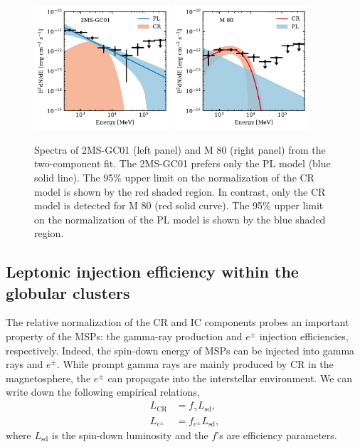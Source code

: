 \documentclass[doublespace,nopageskip]{VTthesis} %
\begin{document}
\begin{figure}[htb]
    \centering
    \includegraphics[width=0.45\textwidth]{Figures/Globular/spectra/2comp_0.pdf}
    \includegraphics[width=0.45\textwidth]{Figures/Globular/spectra/2comp_8.pdf}
    \caption{Spectra of 2MS-GC01 (left panel) and M 80 (right panel) from the two-component fit. The 2MS-GC01 prefers only the {PL} model (blue solid line). The 95\% upper limit on the normalization of the CR model is shown by the red shaded region. In contrast, only the CR model is detected for M 80 (red solid curve). The 95\% upper limit on the normalization of the {PL} model is shown by the blue shaded region.}
    \label{fig:global_spectra_ul}
\end{figure}

\subsection{Leptonic injection efficiency within the globular clusters}\label{spectra_fe}

The relative normalization of the CR and IC components probes an important property of the MSPs: the gamma-ray production and $e^\pm$ injection efficiencies, respectively. Indeed, the spin-down energy of MSPs can be injected into gamma rays and $e^\pm$. While prompt gamma rays are mainly produced by CR in the magnetosphere, the $e^\pm$ can propagate into the interstellar environment. We can write down the following empirical relations,
\begin{align}
    L_\mathrm{CR} &= f_\gamma L_\mathrm{sd},\\
    L_{e^\pm} &= f_{e^\pm} L_\mathrm{sd},
\end{align}
where $L_\mathrm{sd}$ is the spin-down luminosity and the $f$'s are efficiency parameters. 
\end{document}

